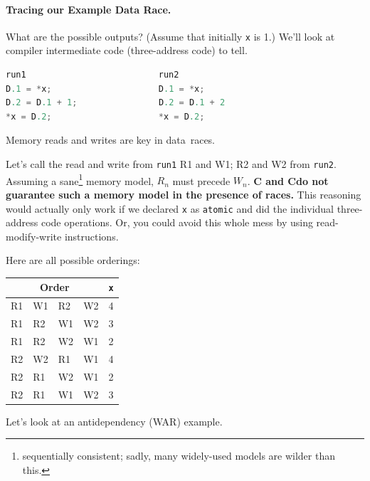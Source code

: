 \documentclass[a4paper]{report}
\newcommand{\CPP}{C\nolinebreak\hspace{-.05em}\raisebox{.4ex}{\tiny\bf +}\nolinebreak\hspace{-.10em}\raisebox{.4ex}{\tiny\bf +}}
\def\CPP{{C\nolinebreak[4]\hspace{-.05em}\raisebox{.4ex}{\tiny\bf ++}}}
\begin{document}

\paragraph{Tracing our Example Data Race.} 
What are the possible outputs? (Assume that initially {\tt *x} is 1.)
We'll look at compiler intermediate code (three-address code) to tell.

\hspace*{.2\textwidth}\begin{minipage}{.8\textwidth}
\begin{lstlisting}[language=C]
run1                          run2   
D.1 = *x;                     D.1 = *x;
D.2 = D.1 + 1;                D.2 = D.1 + 2
*x = D.2;                     *x = D.2;
  \end{lstlisting}
\end{minipage}

Memory reads and writes are key in data~races.

Let's call the read and write from {\tt run1} R1 and W1; R2 and W2
from {\tt run2}. Assuming a sane\footnote{sequentially consistent; sadly, many
widely-used models are wilder than this.}
memory model, $R_n$ must precede $W_n$. {\bf C and \CPP do not guarantee
  such a memory model in the presence of races.} This reasoning would
actually only work if we declared {\tt x} as {\tt atomic} and did the
individual three-address code operations. Or, you could avoid this whole
mess by using read-modify-write instructions.

Here are all possible orderings:
  \begin{center}
    \begin{tabular}{llll|l}
\multicolumn{4}{c|}{Order} & {\tt *x}\\
\hline
R1 & W1 & R2 & W2 & 4 \\
R1 & R2 & W1 & W2 & 3 \\
R1 & R2 & W2 & W1 & 2 \\
R2 & W2 & R1 & W1 & 4 \\
R2 & R1 & W2 & W1 & 2 \\
R2 & R1 & W1 & W2 & 3 \\
    \end{tabular}
  \end{center}


Let's look at an antidependency (WAR) example.
\end{document}
